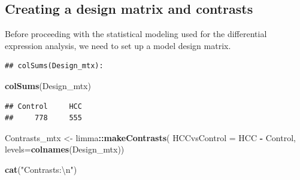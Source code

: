 \documentclass[
]{book}
\newenvironment{Shaded}{\begin{snugshade}}{\end{snugshade}}
\newcommand{\CharTok}[1]{\textcolor[rgb]{0.31,0.60,0.02}{#1}}
\newcommand{\DataTypeTok}[1]{\textcolor[rgb]{0.13,0.29,0.53}{#1}}
\newcommand{\DecValTok}[1]{\textcolor[rgb]{0.00,0.00,0.81}{#1}}
\newcommand{\KeywordTok}[1]{\textcolor[rgb]{0.13,0.29,0.53}{\textbf{#1}}}
\newcommand{\NormalTok}[1]{#1}
\newcommand{\OperatorTok}[1]{\textcolor[rgb]{0.81,0.36,0.00}{\textbf{#1}}}
\newcommand{\StringTok}[1]{\textcolor[rgb]{0.31,0.60,0.02}{#1}}
\begin{document}
\hypertarget{creating-a-design-matrix-and-contrasts}{%
\subsection*{Creating a design matrix and contrasts}\label{creating-a-design-matrix-and-contrasts}}

Before proceeding with the statistical modeling used for the
differential expression analysis, we need to set up a
model design matrix.

\begin{Shaded}
\end{Shaded}

\begin{verbatim}
## colSums(Design_mtx):
\end{verbatim}

\begin{Shaded}
\begin{Highlighting}[]
\KeywordTok{colSums}\NormalTok{(Design\_mtx)}
\end{Highlighting}
\end{Shaded}

\begin{verbatim}
## Control     HCC 
##     778     555
\end{verbatim}

\begin{Shaded}
\begin{Highlighting}[]
\NormalTok{Contrasts\_mtx <{-}}\StringTok{ }\NormalTok{limma}\OperatorTok{::}\KeywordTok{makeContrasts}\NormalTok{(}
  \DataTypeTok{HCCvsControl =}\NormalTok{ HCC  }\OperatorTok{{-}}\StringTok{ }\NormalTok{Control,}
  \DataTypeTok{levels=}\KeywordTok{colnames}\NormalTok{(Design\_mtx))}

\KeywordTok{cat}\NormalTok{(}\StringTok{"Contrasts:}\CharTok{\textbackslash{}n}\StringTok{"}\NormalTok{)}
\end{Highlighting}
\end{Shaded}
\end{document}
